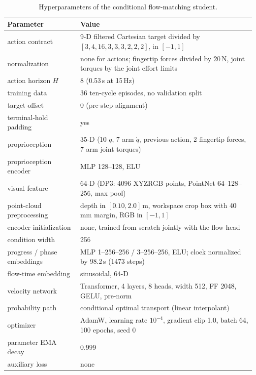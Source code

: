 \begin{table}[!htbp]%
    \centering%
    \caption{Hyperparameters of the conditional flow-matching student.}%
    \label{tab:flow}%
    \small
\begin{tabularx}{\textwidth}{lY}
        \toprule
        Parameter & Value \\
        \midrule
        action contract & 9-D filtered Cartesian target divided by $[3,4,16,3,3,3,2,2,2]$, in $[-1,1]$ \\
        normalization & none for actions; fingertip forces divided by 20\,N, joint torques by the joint effort limits \\
        action horizon $H$ & 8 (0.53\,s at 15\,Hz) \\
        training data & 36 ten-cycle episodes, no validation split \\
        target offset & 0 (pre-step alignment) \\
        terminal-hold padding & yes \\
        proprioception & 35-D (10 $q$, 7 arm $\dot{q}$, previous action, 2 fingertip forces, 7 arm joint torques) \\
        proprioception encoder & \acs{MLP} 128--128, ELU \\
        visual feature & 64-D (\ac{DP3}: 4096 XYZRGB points, PointNet 64--128--256, max pool) \\
        point-cloud preprocessing & depth in $[0.10,2.0]$\,m, workspace crop box with 40\,mm margin, RGB in $[-1,1]$ \\
        encoder initialization & none, trained from scratch jointly with the flow head \\
        condition width & 256 \\
        progress / phase embeddings & \acs{MLP} 1--256--256 / 3--256--256, ELU; clock normalized by 98.2\,s (1473 steps) \\
        flow-time embedding & sinusoidal, 64-D \\
        velocity network & Transformer, 4 layers, 8 heads, width 512, FF 2048, GELU, pre-norm \\
        probability path & conditional optimal transport (linear interpolant) \\
        optimizer & AdamW, learning rate $10^{-4}$, gradient clip 1.0, batch 64, 100 epochs, seed 0 \\
        parameter \acs{EMA} decay & 0.999 \\
        auxiliary loss & none \\

\end{tabularx}
\end{table}
